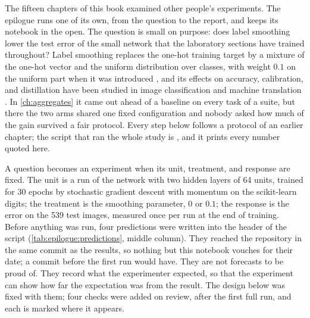 \label{ch:epilogue}
\begin{refsection}

The fifteen chapters of this book examined other people's experiments. The epilogue runs one of its own, from the question to the report, and keeps its notebook in the open. The question is small on purpose: does label smoothing lower the test error of the small network that the laboratory sections have trained throughout? Label smoothing replaces the one-hot training target by a mixture of the one-hot vector and the uniform distribution over classes, with weight $0.1$ on the uniform part when it was introduced \parencite{SzegedyEtAl2016}, and its effects on accuracy, calibration, and distillation have been studied in image classification and machine translation \parencite{MullerKornblithHinton2019}. In \cref{ch:aggregates} it came out ahead of a baseline on every task of a suite, but there the two arms shared one fixed configuration and nobody asked how much of the gain survived a fair protocol. Every step below follows a protocol of an earlier chapter; the script that ran the whole study is , and it prints every number quoted here.


A question becomes an experiment when its unit, treatment, and response are fixed. The unit is a run of the network with two hidden layers of 64 units, trained for 30 epochs by stochastic gradient descent with momentum on the scikit-learn digits; the treatment is the smoothing parameter, $0$ or $0.1$; the response is the error on the 539 test images, measured once per run at the end of training. Before anything was run, four predictions were written into the header of the script (\cref{tab:epilogue:predictions}, middle column). They reached the repository in the same commit as the results, so nothing but this notebook vouches for their date; a commit before the first run would have. They are not forecasts to be proud of. They record what the experimenter expected, so that the experiment can show how far the expectation was from the result. The design below was fixed with them; four checks were added on review, after the first full run, and each is marked where it appears.


\end{refsection}
